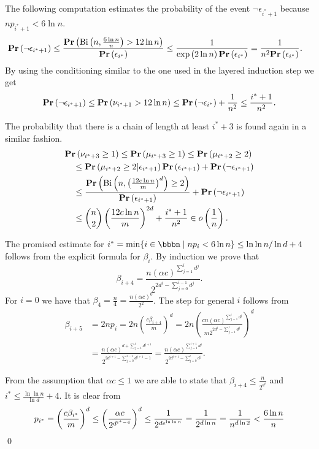 \documentclass[runningheads,a4paper]{llncs}
\begin{document}
The following computation estimates the probability of the event $\neg \epsilon_{i^* + 1}$ because $np_{i^* + 1} < 6 \ln n$.
\[
\begin{split}
\mathbf{Pr}\left(\neg \epsilon_{i^* + 1}\right)
	\leq \frac{\mathbf{Pr}\left(\mathrm{Bi}\left(n, \frac{6 \ln n}{n}\right) > 12 \ln n\right)}{\mathbf{Pr}\left(\epsilon_{i^*}\right)} 
	& \leq \frac{1}{\exp\left(2 \ln n\right)\mathbf{Pr}\left(\epsilon_{i^*}\right)} = \frac{1}{n ^ 2 \mathbf{Pr}\left(\epsilon_{i^*}\right)} \textit{.}
\end{split}
\]
By using the conditioning similar to the one used in the layered induction step we get
\[
\mathbf{Pr}\left(\neg \epsilon_{i^* + 1}\right) \leq \mathbf{Pr}\left(\nu_{i^* + 1} > 12 \ln n\right) \leq \mathbf{Pr}\left(\neg \epsilon_{i^*}\right) + \frac{1}{n ^ 2} \leq \frac{i^* + 1}{n ^ 2} \textit{.}
\]

The probability that there is a chain of length at least $i^* + 3$ is found again in a similar fashion.
\[
\begin{split}
& \mathbf{Pr}\left(\nu_{i^* + 3} \geq 1\right)
	\leq \mathbf{Pr}\left(\mu_{i^* + 3} \geq 1\right) \leq \mathbf{Pr}\left(\mu_{i^* + 2} \geq 2\right) \\
	& \quad \leq \mathbf{Pr}\left(\mu_{i^* + 2} \geq 2 | \epsilon_{i^* + 1}\right)\mathbf{Pr}\left(\epsilon_{i^* + 1}\right) + \mathbf{Pr}\left(\neg \epsilon_{i^* + 1}\right) \\
	& \quad \leq \frac{\mathbf{Pr}\left(\mathrm{Bi}\left(n, \left(\frac{12 c \ln n}{m}\right) ^ d\right) \geq 2\right)}{\mathbf{Pr}\left(\epsilon_{i^* + 1}\right)} + \mathbf{Pr}\left(\neg \epsilon_{i^* + 1}\right) \\
	& \quad \leq \binom{n}{2} \left(\frac{12 c \ln n}{m}\right) ^ {2d} + \frac{i^* + 1}{n ^ 2} \in o\left(\frac{1}{n}\right) \textit{.}
\end{split}
\]

The promised estimate for $i^* = \displaystyle\min \{i \in \bbbn \setdelim np_i < 6 \ln n\} \leq \ln \ln n / \ln d + 4$ follows from the explicit formula for $\beta_i$. By induction we prove that $$\beta_{i + 4} = \frac{n \left(\alpha c\right) ^ {\sum_{j = 1}^{i}d ^ j}}{2 ^ {2 d ^ i - \sum_{j = 0}^{i - 1}{d ^ j}}} \textit{.}$$ For $i = 0$ we have that $\beta_4 = \frac{n}{4} = \frac{n\left(\alpha c\right) ^ 0}{2 ^ {2}}$. The step for general $i$ follows from
\[
\begin{split}
\beta_{i + 5} 
	& = 2np_i = 2n \left(\frac{c\beta_{i + 4}}{m}\right) ^ d = 2n \left(\frac{cn\left(\alpha c\right) ^ {\sum_{j = 1}^{i}d ^ j}}{m 2 ^ {2 d ^ i - \sum_{j = 1}^{i}d^j}}\right) ^ d \\
	& = \frac{n\left(\alpha c\right) ^ {d + \sum_{j = 1}^{i} d ^ {j + 1}}}{2 ^ {2d ^ {i + 1} - \sum_{j = 0}^{i  -1} d ^ {j + 1} - 1}} = \frac{n \left(\alpha c\right) ^ {\sum_{j = 1}^{i + 1} d ^ j}}{2 ^ {2d ^ {i + 1} - \sum_{j = 0}^{i} d ^ j}} \textit{.}
\end{split}
\]

From the assumption that $\alpha c \leq 1$ we are able to state that $\beta_{i + 4} \leq \frac{n}{2 ^ {d ^ i}}$ and $i^* \leq \frac{\ln \ln n}{\ln d} + 4$. It is clear from
\[
p_{i^*} = \left(\frac{c\beta_{i^*}}{m}\right) ^ d \leq \left(\frac{\alpha c}{2 ^ {d ^ {i^* - 4}}}\right) ^ d \leq \frac{1}{2 ^ {de^{\ln \ln n}}} = \frac{1}{2 ^ {d \ln n}} = \frac{1}{n ^ {d \ln 2}} < \frac{6 \ln n}{n}\\
\]
\qed
\end{document}
